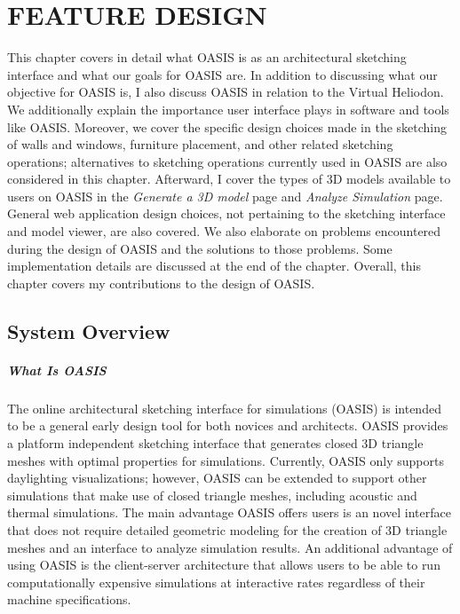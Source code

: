 \chapter{FEATURE DESIGN} \label{sec:feature}
This chapter covers in detail what OASIS is as an architectural sketching interface and what our goals for OASIS are. In addition to discussing what our objective for OASIS is, I also discuss OASIS in relation to the Virtual Heliodon. We additionally explain the importance user interface plays in software and tools like OASIS. Moreover, we cover the specific design choices made in the sketching of walls and windows, furniture placement, and other related sketching operations; alternatives to sketching operations  currently used in OASIS are also considered in this chapter.  Afterward, I cover the types of 3D models available to users on OASIS in the \textit{Generate a 3D model} page and \textit{Analyze Simulation} page. General web application design choices, not pertaining to the sketching interface and model viewer, are also covered. We also elaborate on problems encountered during the design of OASIS and the solutions to those problems. Some implementation details are discussed at the end of the chapter. Overall, this chapter covers my contributions to the design of OASIS.  \\

\section{System Overview}


\paragraph{What Is OASIS}
The online architectural sketching interface for simulations (OASIS) is intended to be a  general early design tool for both novices and architects. OASIS provides a platform independent sketching interface that generates closed 3D triangle meshes with optimal properties for simulations. Currently, OASIS only supports daylighting visualizations; however, OASIS can be extended to support other simulations that make use of closed triangle meshes, including acoustic and thermal simulations. The main advantage OASIS offers users is an novel interface that does not require detailed geometric modeling for the creation of 3D triangle meshes and an interface to analyze simulation results. An additional advantage of using OASIS is the client-server architecture that allows users to be able to run computationally expensive simulations at interactive rates regardless of their machine specifications.\\

